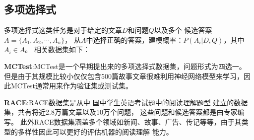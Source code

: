 \subsection{多项选择式}
多项选择式这类任务是对于给定的文章$D$和问题$Q$以及多个
候选答案$A=\{A_1,A_2,\cdots,A_n\}$，
从$A$中选择正确的答案，建模概率：$P(A_i|D,Q)$，其中$A_i \in A$。
相关数据集如下：

\textbf{MCTest}:\quad MCTest是一个早期提出来的多项选择式数据集，问题形式为四选一。
但是由于其规模比较小仅仅包含500篇故事文章很难利用神经网络模型来学习，因此MCTest通常用来作为验证集或测试集。

\textbf{RACE}:\quad RACE数据集是从中
国中学生英语考试题中的阅读理解题型
建立的数据集，共有将近2.8万篇文章以及10万个问题，
这些问题和候选答案都是由专家编写。
此外RACE数据集涵盖多个领域如新闻、故事、广告、传记等等，由于其类型的多样性因此可以更好的评估机器的阅读理解
能力。

